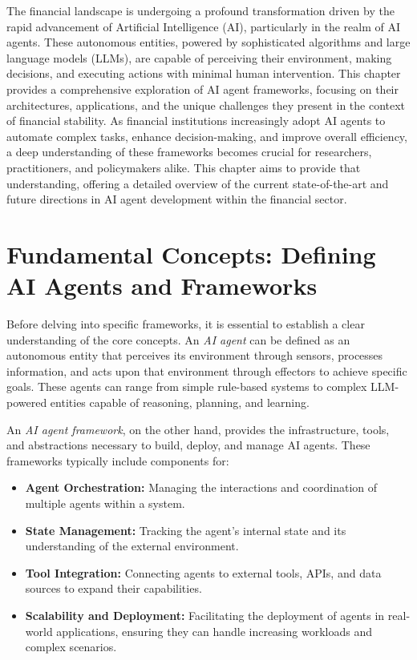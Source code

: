 \documentclass[a4paper,headinclude=on,footinclude=on,12pt,oneside]{scrbook}
\begin{document}
The financial landscape is undergoing a profound transformation driven by the rapid advancement of Artificial Intelligence (AI), particularly in the realm of AI agents. These autonomous entities, powered by sophisticated algorithms and large language models (LLMs), are capable of perceiving their environment, making decisions, and executing actions with minimal human intervention. This chapter provides a comprehensive exploration of AI agent frameworks, focusing on their architectures, applications, and the unique challenges they present in the context of financial stability. As financial institutions increasingly adopt AI agents to automate complex tasks, enhance decision-making, and improve overall efficiency, a deep understanding of these frameworks becomes crucial for researchers, practitioners, and policymakers alike. This chapter aims to provide that understanding, offering a detailed overview of the current state-of-the-art and future directions in AI agent development within the financial sector.

\section*{Fundamental Concepts: Defining AI Agents and Frameworks}

Before delving into specific frameworks, it is essential to establish a clear understanding of the core concepts. An \textit{AI agent} can be defined as an autonomous entity that perceives its environment through sensors, processes information, and acts upon that environment through effectors to achieve specific goals. These agents can range from simple rule-based systems to complex LLM-powered entities capable of reasoning, planning, and learning.

An \textit{AI agent framework}, on the other hand, provides the infrastructure, tools, and abstractions necessary to build, deploy, and manage AI agents. These frameworks typically include components for:

\begin{itemize}
	\item \textbf{Agent Orchestration:} Managing the interactions and coordination of multiple agents within a system.
	\item \textbf{State Management:} Tracking the agent's internal state and its understanding of the external environment.
	\item \textbf{Tool Integration:} Connecting agents to external tools, APIs, and data sources to expand their capabilities.
	\item \textbf{Scalability and Deployment:} Facilitating the deployment of agents in real-world applications, ensuring they can handle increasing workloads and complex scenarios.
\end{itemize}
\end{document}
